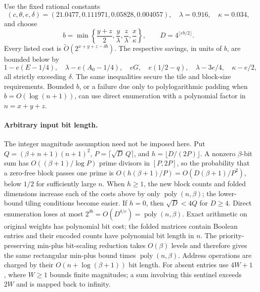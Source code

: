 \documentclass[11pt]{article}
\newcommand{\softO}{\widetilde O}
\begin{document}
Use the fixed rational constants
\[
(c,\theta,e,\delta)=(21.0477,0.111971,0.05828,0.004057),
\quad \lambda=0.916,\quad \kappa=0.034,
\]
and choose
\[
b=\min\left\{\frac{y+z}{2},\frac y\lambda,
                 \frac z\lambda,\frac x\kappa\right\},
\qquad D=4^{\lfloor eb/2\rfloor}.
\]
Every listed cost is $\softO(2^{x+y+z-\delta b})$. The respective
savings, in units of $b$, are bounded below by
\[
1-e(E-1/4),\quad \lambda-e(A_0-1/4),\quad
eG,\quad e(1/2-q),\quad \lambda-3e/4,\quad \kappa-e/2,
\]
all strictly exceeding $\delta$. The same inequalities secure the tile
and block-size requirements. Bounded $b$, or a failure due only to
polylogarithmic padding when $b=O(\log(n+1))$, can use direct enumeration
with a polynomial factor in $n=x+y+z$.

\paragraph{Arbitrary input bit length.}
The integer magnitude assumption need not be imposed here. Put
$Q=(\beta+n+1)(n+1)^2$, $P=\lceil\sqrt D\,Q\rceil$, and
$h=\lfloor D/(2P)\rfloor$. A nonzero $\beta$-bit sum has
$O((\beta+1)/\log P)$ prime divisors in $[P,2P]$, so the probability
that a zero-free block passes one prime is
$O(h(\beta+1)/P)=O(D(\beta+1)/P^2)$, below $1/2$ for sufficiently
large $n$. When $h\ge1$, the new block counts and folded dimensions
increase each of the costs above by only $\operatorname{poly}(n,\beta)$;
the lower-bound tiling conditions become easier. If $h=0$, then
$\sqrt D<4Q$ for $D\ge4$. Direct enumeration loses at most
$2^{\delta b}=O(D^{\delta/e})=\operatorname{poly}(n,\beta)$.
Exact arithmetic on original weights has polynomial bit cost; the
folded matrices contain Boolean entries and their encoded counts have
polynomial bit length in $n$. The priority-preserving min-plus bit-scaling
reduction takes $O(\beta)$ levels and therefore gives the same rectangular
min-plus bound times $\operatorname{poly}(n,\beta)$. Address operations
are charged by their $O(n+\log(\beta+1))$ bit length.
For absent entries use $4W+1$, where $W\ge1$ bounds finite magnitudes;
a sum involving this sentinel exceeds $2W$ and is mapped back to infinity.
\end{document}
